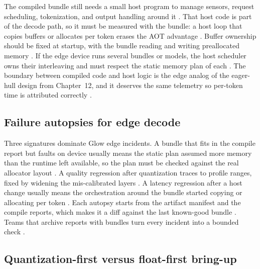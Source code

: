 The compiled bundle still needs a small host program to manage sensors, request scheduling, tokenization, and output handling around it \citep{kwon2023vllm,patel2025llminference}. That host code is part of the decode path, so it must be measured with the bundle: a host loop that copies buffers or allocates per token erases the AOT advantage \citep{memoryfloor2026,taxbreak2026}. Buffer ownership should be fixed at startup, with the bundle reading and writing preallocated memory \citep{rotem2018glow,patel2025llminference}. If the edge device runs several bundles or models, the host scheduler owns their interleaving and must respect the static memory plan of each \citep{amd2024aie,memoryfloor2026}. The boundary between compiled code and host logic is the edge analog of the eager-hull design from Chapter~12, and it deserves the same telemetry so per-token time is attributed correctly \citep{nvidia2024cudagraphs,taxbreak2026}.

\subsection{Failure autopsies for edge decode}

Three signatures dominate Glow edge incidents. A bundle that fits in the compile report but faults on device usually means the static plan assumed more memory than the runtime left available, so the plan must be checked against the real allocator layout \citep{rotem2018glow,amd2024aie}. A quality regression after quantization traces to profile ranges, fixed by widening the mis-calibrated layers \citep{rotem2018glow,patel2025llminference}. A latency regression after a host change usually means the orchestration around the bundle started copying or allocating per token \citep{memoryfloor2026,taxbreak2026}. Each autopsy starts from the artifact manifest and the compile reports, which makes it a diff against the last known-good bundle \citep{chen2020compilerbasedhardw,memoryfloor2026}. Teams that archive reports with bundles turn every incident into a bounded check \citep{rotem2018glow,taxbreak2026}.

\subsection{Quantization-first versus float-first bring-up}

